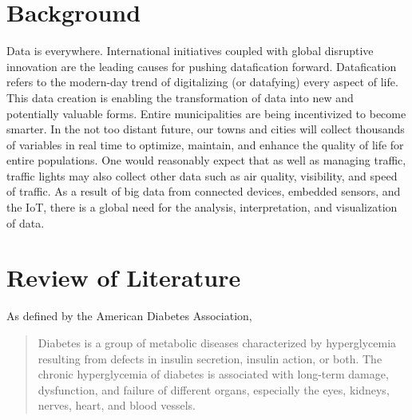 \documentclass[12pt]{article}
\begin{document}
\newpage
\part{Background}
Data is everywhere. International initiatives coupled with global disruptive innovation are the leading causes for pushing datafication forward. Datafication refers to the modern-day trend of digitalizing (or datafying) every aspect of life. This data creation is enabling the transformation of data into new and potentially valuable forms. Entire municipalities are being incentivized to become smarter. In the not too distant future, our towns and cities will collect thousands of variables in real time to optimize, maintain, and enhance the quality of life for entire populations. One would reasonably expect that as well as managing traffic, traffic lights may also collect other data such as air quality, visibility, and speed of traffic. As a result of big data from connected devices, embedded sensors, and the IoT, there is a global need for the analysis, interpretation, and visualization of data.

\newpage
\part{Review of Literature}
\iffalse
Source : https://www.ncbi.nlm.nih.gov/pmc/articles/PMC5851210/
---------------------
Source : https://www.ncbi.nlm.nih.gov/pmc/articles/PMC6000484/
---------------------
PDF :
Andreas Holzinger 1,2( B )

Holzinger Group, HCI-KDD, Institute for Medical Informatics,
Statistics and Documentation, Medical University Graz, Graz, Austria
a.holzinger@hci-kdd.org

Institute for Information Systems and Computer Media,
Graz University of Technology, Graz, Austria
---------------------
\fi
As defined by the American Diabetes Association\cite{classdiag},
\begin{quote}
Diabetes is a group of metabolic diseases characterized by hyperglycemia resulting from defects in insulin secretion, insulin action, or both. The chronic hyperglycemia of diabetes is associated with long-term damage, dysfunction, and failure of different organs, especially the eyes, kidneys, nerves, heart, and blood vessels.
\end{quote}
\end{document}

